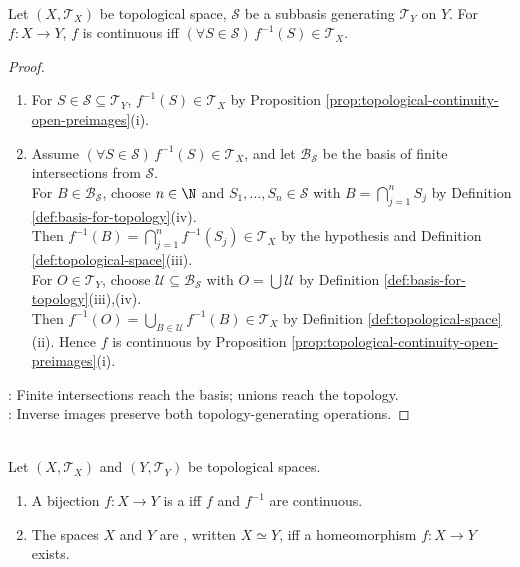 \begin{proposition} \label{prop:continuity-tested-on-subbasis} \\
Let $(X,\mathcal{T}_X)$ be topological space, $\mathcal{S}$ be a subbasis generating $\mathcal{T}_Y$ on $Y$. For $f:X\to Y$, $f$ is continuous iff $(\forall S\in\mathcal{S})\,f^{-1}(S)\in\mathcal{T}_X$.
\begin{proof}
\begin{enumerate}[label=\roman*.]
\setlength{\itemsep}{0pt}
\item[$(\Rightarrow)$] For $S\in\mathcal{S}\subseteq\mathcal{T}_Y$, $f^{-1}(S)\in\mathcal{T}_X$ by Proposition \ref{prop:topological-continuity-open-preimages}(i).
\item[$(\Leftarrow)$] Assume $(\forall S\in\mathcal{S})\,f^{-1}(S)\in\mathcal{T}_X$, and let $\mathcal{B}_{\mathcal{S}}$ be the basis of finite intersections from $\mathcal{S}$.\\
For $B\in\mathcal{B}_{\mathcal{S}}$, choose $n\in\N$ and $S_1,\ldots,S_n\in\mathcal{S}$ with $B=\bigcap\limits_{j=1}^nS_j$ by Definition \ref{def:basis-for-topology}(iv).\\
Then $f^{-1}(B)=\bigcap\limits_{j=1}^nf^{-1}(S_j)\in\mathcal{T}_X$ by the hypothesis and Definition \ref{def:topological-space}(iii).\\
For $O\in\mathcal{T}_Y$, choose $\mathcal{U}\subseteq\mathcal{B}_{\mathcal{S}}$ with $O=\bigcup\mathcal{U}$ by Definition \ref{def:basis-for-topology}(iii),(iv).\\
Then $f^{-1}(O)=\bigcup\limits_{B\in\mathcal{U}}f^{-1}(B)\in\mathcal{T}_X$ by Definition \ref{def:topological-space}(ii). Hence $f$ is continuous by Proposition \ref{prop:topological-continuity-open-preimages}(i).
\end{enumerate}
: Finite intersections reach the basis; unions reach the topology.\\
: Inverse images preserve both topology-generating operations.
\end{proof}
\end{proposition}

\begin{definition} \label{def:topological-homeomorphism} \\
Let $(X,\mathcal{T}_X)$ and $(Y,\mathcal{T}_Y)$ be topological spaces.
\begin{enumerate}[label=(\roman*)]
\setlength{\itemsep}{0pt}
\item A bijection $f:X\to Y$ is a  iff $f$ and $f^{-1}$ are continuous.
\item The spaces $X$ and $Y$ are , written $X\simeq Y$, iff a homeomorphism $f:X\to Y$ exists.
\end{enumerate}
\end{definition}

